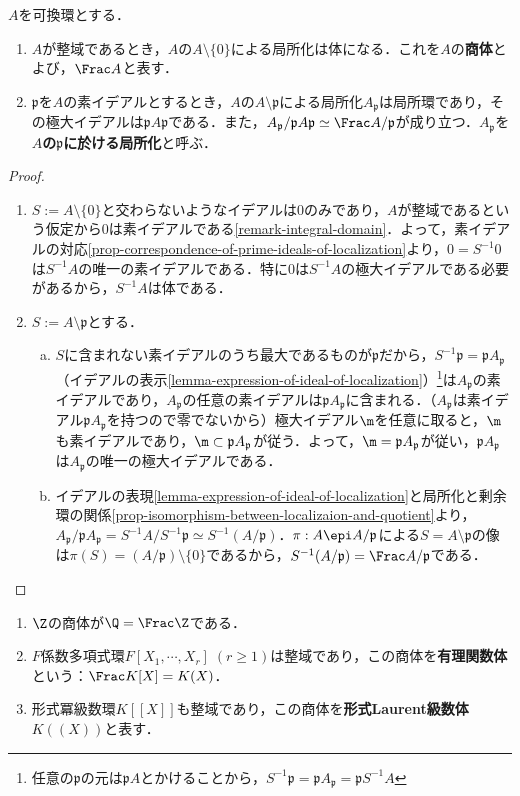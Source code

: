 \documentclass[uplatex,dvipdfmx]{jsreport}
\renewcommand{\p}{\mathfrak{p}}
\begin{document}
\begin{definition}
    $A$を可換環とする．
    \begin{enumerate}
        \item $A$が整域であるとき，$A$の$A\setminus\{0\}$による局所化は体になる．これを$A$の\textbf{商体}とよび，$\Frac A$と表す．
        \item $\p$を$A$の素イデアルとするとき，$A$の$A\setminus\p$による局所化$A_\p$は局所環であり，その極大イデアルは$\p A\p$である．また，$A_\p/\p A\p\simeq\Frac A/\p$が成り立つ．$A_\p$を\textbf{$A$の$\p$に於ける局所化}と呼ぶ．
    \end{enumerate}
\end{definition}
\begin{proof}\mbox{}
    \begin{enumerate}
        \item $S:=A\setminus\{0\}$と交わらないようなイデアルは$0$のみであり，$A$が整域であるという仮定から$0$は素イデアルである\ref{remark-integral-domain}．よって，素イデアルの対応\ref{prop-correspondence-of-prime-ideals-of-localization}より，$0=S^{-1}0$は$S^{-1}A$の唯一の素イデアルである．特に$0$は$S^{-1}A$の極大イデアルである必要があるから，$S^{-1}A$は体である．
        \item $S:=A\setminus\p$とする．
        \begin{enumerate}[(a)]
            \item $S$に含まれない素イデアルのうち最大であるものが$\p$だから，$S^{-1}\p=\p A_\p$（イデアルの表示\ref{lemma-expression-of-ideal-of-localization}）\footnote{任意の$\p$の元は$\p A$とかけることから，$S^{-1}\p=\p A_\p=\p S^{-1}A$}は$A_\p$の素イデアルであり，$A_\p$の任意の素イデアルは$\p A_\p$に含まれる．（$A_\p$は素イデアル$\p A_\p$を持つので零でないから）極大イデアル$\m$を任意に取ると，$\m$も素イデアルであり，$\m\subset\p A_\p$が従う．よって，$\m=\p A_\p$が従い，$\p A_\p$は$A_\p$の唯一の極大イデアルである．
            \item イデアルの表現\ref{lemma-expression-of-ideal-of-localization}と局所化と剰余環の関係\ref{prop-isomorphism-between-localizaion-and-quotient}より，
            $A_\p/\p A_\p=S^{-1}A/S^{-1}\p\simeq S^{-1}(A/\p)$．$\pi:A\epi A/\p$による$S=A\setminus\p$の像は$\pi(S)=(A/\p)\setminus\{0\}$であるから，$S^{-1}(A/\p)=\Frac A/\p$である．
        \end{enumerate}
    \end{enumerate}
\end{proof}
\begin{example}[商体の例]\label{exp-field-of-quotients}\mbox{}
    \begin{enumerate}
        \item $\Z$の商体が$\Q=\Frac\Z$である．
        \item $F$係数多項式環$F[X_1,\cdots,X_r]\;(r\ge 1)$は整域であり，この商体を\textbf{有理関数体}という：$\Frac K[X]=K(X)$．
        \item 形式冪級数環$K[[X]]$も整域であり，この商体を\textbf{形式Laurent級数体}$K((X))$と表す．
    \end{enumerate}
\end{example}
\end{document}
